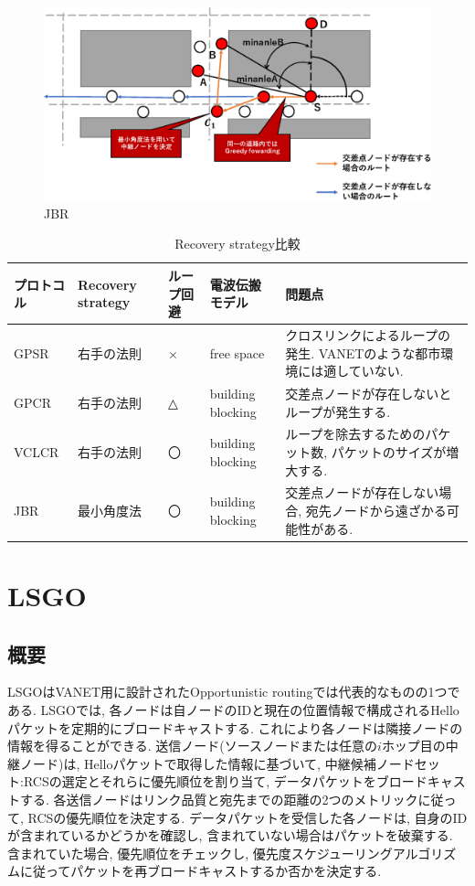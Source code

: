 \documentclass[10pt]{jreport}
\begin{document}
\begin{figure}[!ht]
	\centering
	\includegraphics[width=140mm]{figures/JBR.eps}
	\caption{JBR}
	\label{fig:JBR}
\end{figure}

\begin{table}[h]
	\begin{center}
		\caption{Recovery strategy比較}
		\label{tab:Recovery}
		\centering
		\begin{tabular}{p{20mm}p{28mm}p{20mm}p{28mm}p{40mm}}
			\hline
			プロトコル & Recovery strategy & ループ回避 & 電波伝搬モデル & 問題点 \\
			\hline \hline
			GPSR & 右手の法則 & × & free space & クロスリンクによるループの発生. VANETのような都市環境には適していない.\\ 
			GPCR  & 右手の法則  & △ & building blocking &  交差点ノードが存在しないとループが発生する. \\
			VCLCR & 右手の法則  & 〇 & building blocking   &  ループを除去するためのパケット数, パケットのサイズが増大する. \\
			JBR & 最小角度法  & 〇 & building blocking   &  交差点ノードが存在しない場合, 宛先ノードから遠ざかる可能性がある. \\
			\hline
		\end{tabular}
	\end{center}
\end{table}



\chapter{LSGO}
\label{LSGO}
\section{概要}
LSGO\cite{18}はVANET用に設計されたOpportunistic routingでは代表的なものの1つである.
LSGOでは, 各ノードは自ノードのIDと現在の位置情報で構成されるHelloパケットを定期的にブロードキャストする. これにより各ノードは隣接ノードの情報を得ることができる.
送信ノード(ソースノードまたは任意の$i$ホップ目の中継ノード)は, Helloパケットで取得した情報に基づいて, 中継候補ノードセット:RCSの選定とそれらに優先順位を割り当て, データパケットをブロードキャストする. 各送信ノードはリンク品質と宛先までの距離の2つのメトリックに従って, RCSの優先順位を決定する. データパケットを受信した各ノードは, 自身のIDが含まれているかどうかを確認し, 含まれていない場合はパケットを破棄する. 含まれていた場合, 優先順位をチェックし, 優先度スケジューリングアルゴリズムに従ってパケットを再ブロードキャストするか否かを決定する.
\end{document}
